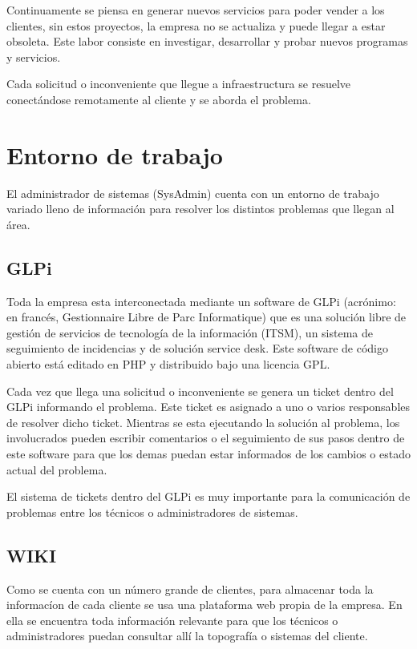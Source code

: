 \documentclass[12pt,a4paper]{article}
\begin{document}
Continuamente se piensa en generar nuevos servicios para poder vender a los clientes, sin estos proyectos, la empresa no se actualiza y puede llegar a estar obsoleta. Este labor consiste en investigar, desarrollar y probar nuevos programas y servicios.

Cada solicitud o inconveniente que llegue a infraestructura se resuelve conectándose remotamente al cliente y se aborda el problema.

\section{Entorno de trabajo}
El administrador de sistemas (SysAdmin) cuenta con un entorno de trabajo variado lleno de información para resolver los distintos problemas que llegan al área.

\subsection{GLPi}
Toda la empresa esta interconectada mediante un software de GLPi (acrónimo: en francés, Gestionnaire Libre de Parc Informatique) que es una solución libre de gestión de servicios de tecnología de la información (ITSM), un sistema de seguimiento de incidencias y de solución service desk. Este software de código abierto está editado en PHP y distribuido bajo una licencia GPL. \cite{GLPi}

Cada vez que llega una solicitud o inconveniente se genera un ticket dentro del GLPi informando el problema. Este ticket es asignado a uno o varios responsables de resolver dicho ticket. Mientras se esta ejecutando la solución al problema, los involucrados pueden escribir comentarios o el seguimiento de sus pasos dentro de este software para que los demas puedan estar informados de los cambios o estado actual del problema.

El sistema de tickets dentro del GLPi es muy importante para la comunicación de problemas entre los técnicos o administradores de sistemas.  

\subsection{WIKI}
Como se cuenta con un número grande de clientes, para almacenar toda la informacíon de cada cliente se usa una plataforma web propia de la empresa. En ella se encuentra toda información relevante para que los técnicos o administradores puedan consultar allí la topografía o sistemas del cliente. 
\end{document}
